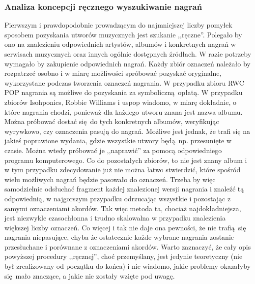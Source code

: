 \subsubsection{Analiza koncepcji ręcznego wyszukiwanie nagrań}
Pierwszym i prawdopodobnie prowadzącym do najmniejszej liczby pomyłek sposobem pozyskania utworów
muzycznych jest szukanie ,,ręczne''. Polegało by ono na znalezieniu odpowiednich artystów, albumów i
konkretnych nagrań w serwisach muzycznych oraz innych ogólnie dostępnych źródłach. W razie
potrzeby wymagało by zakupienie odpowiednich nagrań. Każdy zbiór oznaczeń należało by rozpatrzeć osobno i w miarę
możliwości spróbować pozyskać oryginalne, wykorzystane podczas tworzenia oznaczeń nagrania. W
przypadku zbioru RWC POP nagrania są możliwe do pozyskania za symboliczną opłatą. W przypadku
zbiorów Isohponics, Robbie Williams i uspop wiadomo, w miarę dokładnie, o które nagrania chodzi,
ponieważ dla każdego utworu znana jest nazwa albumu. Można próbować dostać się do tych konkretnych
albumów, weryfikując wyrywkowo, czy oznaczenia pasują do nagrań. Możliwe jest jednak, że trafi się
na jakieś poprawione wydania, gdzie wszystkie utwory będą np. przesunięte w czasie. Można wtedy
próbować je ,,naprawić'' za pomocą odpowiedniego programu komputerowego. Co do pozostałych zbiorów,
to nie jest znany album i w tym przypadku zdecydowanie już nie można łatwo stwierdzić, które spośród
wielu możliwych nagrań będzie pasowało do oznaczeń. Trzeba by więc samodzielnie odsłuchać fragment
każdej znalezionej wersji nagrania i znaleźć tą odpowiednią, w najgorszym przypadku odrzucając
wszystkie i pozostając z samymi oznaczeniami akordów. Tak więc metoda ta, chociaż najdokładniejsza,
jest niezwykle czasochłonna i trudno skalowalna w przypadku znalezienia większej liczby oznaczeń.
Co więcej i tak nie daje ona pewności, że nie trafią się nagrania niepasujące, chyba że ostatecznie
każde wybrane nagrania zostanie przesłuchane i porównane z oznaczeniami akordów. Warto
zaznaczyć, że cały opis powyższej procedury ,,ręcznej'', choć przemyślany, jest jedynie teoretyczny
(nie był zrealizowany od początku do końca) i nie wiadomo, jakie problemy okazałyby się mało
znaczące, a jakie nie zostały wzięte pod uwagę. 

